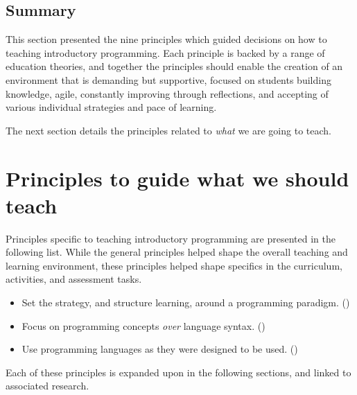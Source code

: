 

\subsection{Summary} %
\label{ssub:summary_of_principles_on_how_to_teach}

This section presented the nine principles which guided decisions on how to teaching introductory programming. Each principle is backed by a range of education theories, and together the principles should enable the creation of an environment that is demanding but supportive, focused on students building knowledge, agile, constantly improving through reflections, and accepting of various individual strategies and pace of learning.

The next section details the principles related to \emph{what} we are going to teach.









\clearpage
\section{Principles to guide what we should teach} %
\label{sec:principles_to_guide_what_we_should_cover}

Principles specific to teaching introductory programming are presented in the following list. While the general principles helped shape the overall teaching and learning environment, these principles helped shape specifics in the curriculum, activities, and assessment tasks.
\begin{itemize}[noitemsep,nolistsep]
	\item Set the strategy, and structure learning, around a programming paradigm. ()
	\item Focus on programming concepts \emph{over} language syntax. ()
	\item Use programming languages as they were designed to be used. ()
\end{itemize}

Each of these principles is expanded upon in the following sections, and linked to associated research.


